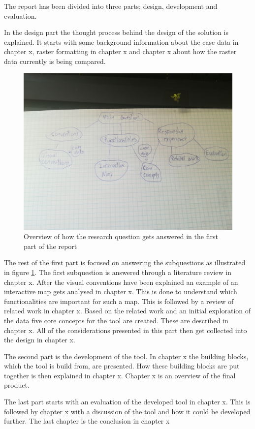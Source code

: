 %
%

The report has been divided into three parts; design, development and evaluation.




In the design part the thought process behind the design of the solution is explained.
It starts with some background information about the case data in chapter x, raster formatting in chapter x and chapter x about how the raster data currently is being compared. 
\begin{figure} [H]
	\centering
	\includegraphics[width=.8\textwidth]{Pictures/Structure}
	\caption{Overview of how the research question gets answered in the first part of the report}
	\label{Structure}
\end{figure}

The rest of the first part is focused on answering the subquestions as illustrated in figure \ref{Structure}. 
The first subquestion is answered through a literature review in chapter x. After the visual conventions have been explained an example of an interactive map gets analysed in chapter x. This is done to understand which functionalities are important for such a map. This is followed by a review of related work in chapter x. Based on the related work and an initial exploration of the data five core concepts for the tool are created. These are described in chapter x. All of the considerations presented in this part then get collected into the design in chapter x. 

The second part is the development of the tool. In chapter x the building blocks, which the tool is build from, are presented. How these building blocks are put together is then explained in chapter x. Chapter x is an overview of the final product.


The last part starts with an evaluation of the developed tool in chapter x. This is followed by chapter x with a discussion of the tool and how it could be developed further. The last chapter is the conclusion in chapter x 

